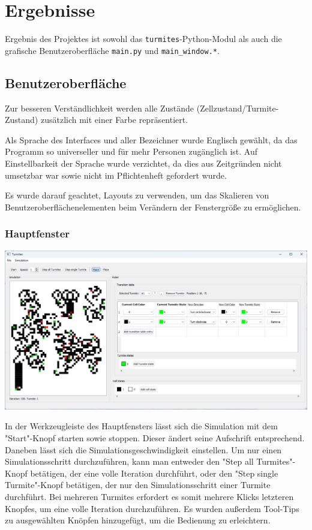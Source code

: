 \section{Ergebnisse}
Ergebnis des Projektes ist sowohl das \texttt{turmites}-Python-Modul als auch die grafische Benutzeroberfläche \texttt{main.py} und \texttt{main\_window.*}.

\subsection{Benutzeroberfläche}
Zur besseren Verständlichkeit werden alle Zustände (Zellzustand/Turmite-Zustand) zusätzlich mit einer Farbe repräsentiert. 

Als Sprache des Interfaces und aller Bezeichner wurde Englisch gewählt, da das Programm so universeller und für mehr Personen zugänglich ist. Auf Einstellbarkeit der Sprache wurde verzichtet, da dies aus Zeitgründen nicht umsetzbar war sowie nicht im Pflichtenheft \cite{pflichtenheft} gefordert wurde.

Es wurde darauf geachtet, Layouts zu verwenden, um das Skalieren von Benutzeroberflächenelementen beim Verändern der Fenstergröße zu ermöglichen.

\subsubsection{Hauptfenster}
\includegraphics[width=\textwidth]{main_window.png}

In der Werkzeugleiste des Hauptfensters lässt sich die Simulation mit dem "Start"-Knopf starten sowie stoppen. Dieser ändert seine Aufschrift entsprechend. Daneben lässt sich die Simulationsgeschwindigkeit einstellen. Um nur einen Simulationsschritt durchzuführen, kann man entweder den "Step all Turmites"-Knopf betätigen, der eine volle Iteration durchführt, oder den "Step single Turmite"-Knopf betätigen, der nur den Simulationsschritt einer Turmite durchführt. Bei mehreren Turmites erfordert es somit mehrere Klicks letzteren Knopfes, um eine volle Iteration durchzuführen. Es wurden außerdem Tool-Tips zu ausgewählten Knöpfen hinzugefügt, um die Bedienung zu erleichtern.


